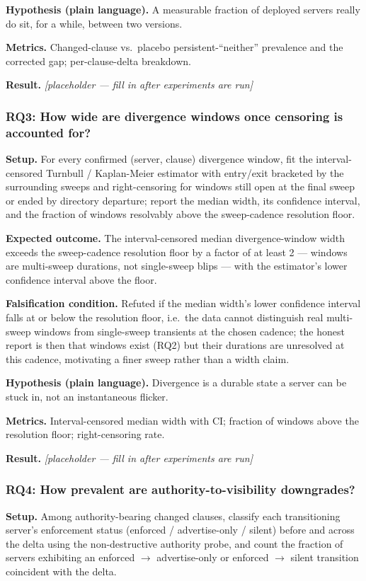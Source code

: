 \documentclass[11pt]{article}
\newcommand{\ph}{\textit{[placeholder --- fill in after experiments are run]}}
\begin{document}
\textbf{Hypothesis (plain language).} A measurable fraction of deployed servers really do sit, for a while, between two versions.

\textbf{Metrics.} Changed-clause vs.\ placebo persistent-``neither'' prevalence and the corrected gap; per-clause-delta breakdown.

\textbf{Result.} \ph

\subsubsection{RQ3: How wide are divergence windows once censoring is accounted for?}

\textbf{Setup.} For every confirmed (server, clause) divergence window, fit the interval-censored Turnbull / Kaplan-Meier estimator with entry/exit bracketed by the surrounding sweeps and right-censoring for windows still open at the final sweep or ended by directory departure; report the median width, its confidence interval, and the fraction of windows resolvably above the sweep-cadence resolution floor.

\textbf{Expected outcome.} The interval-censored median divergence-window width exceeds the sweep-cadence resolution floor by a factor of at least 2 --- windows are multi-sweep durations, not single-sweep blips --- with the estimator's lower confidence interval above the floor.

\textbf{Falsification condition.} Refuted if the median width's lower confidence interval falls at or below the resolution floor, i.e.\ the data cannot distinguish real multi-sweep windows from single-sweep transients at the chosen cadence; the honest report is then that windows exist (RQ2) but their durations are unresolved at this cadence, motivating a finer sweep rather than a width claim.

\textbf{Hypothesis (plain language).} Divergence is a durable state a server can be stuck in, not an instantaneous flicker.

\textbf{Metrics.} Interval-censored median width with CI; fraction of windows above the resolution floor; right-censoring rate.

\textbf{Result.} \ph

\subsubsection{RQ4: How prevalent are authority-to-visibility downgrades?}

\textbf{Setup.} Among authority-bearing changed clauses, classify each transitioning server's enforcement status (enforced / advertise-only / silent) before and across the delta using the non-destructive authority probe, and count the fraction of servers exhibiting an enforced $\to$ advertise-only or enforced $\to$ silent transition coincident with the delta.
\end{document}
